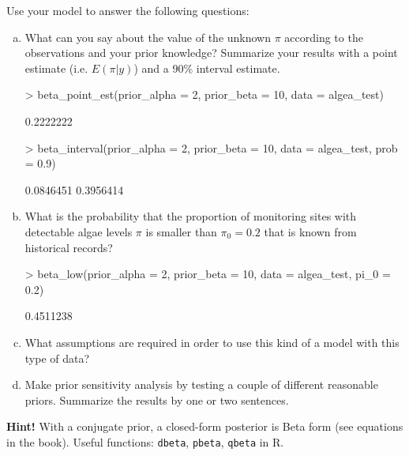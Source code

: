 \documentclass[a4paper,11pt]{article}
\begin{document}
Use your model to answer the following questions:
\begin{enumerate}[a)]
\item What can you say about the value of the unknown $\pi$ according
  to the observations and your prior knowledge? Summarize your results
  with a point estimate (i.e. $E(\pi|y)$) and a 90\% interval estimate.
\begin{Schunk}
\begin{Sinput}
> beta_point_est(prior_alpha = 2, prior_beta = 10, data = algea_test)
\end{Sinput}
\begin{Soutput}
[1] 0.2222222
\end{Soutput}
\begin{Sinput}
> beta_interval(prior_alpha = 2, prior_beta = 10, data = algea_test, prob = 0.9)
\end{Sinput}
\begin{Soutput}
[1] 0.0846451 0.3956414
\end{Soutput}
\end{Schunk}
\item What is the probability that the proportion of monitoring sites with detectable algae levels $\pi$ is smaller than $\pi_0=0.2$ that is known from historical records?
\begin{Schunk}
\begin{Sinput}
> beta_low(prior_alpha = 2, prior_beta = 10, data = algea_test, pi_0 = 0.2)
\end{Sinput}
\begin{Soutput}
[1] 0.4511238
\end{Soutput}
\end{Schunk}
\item What assumptions are required in order to use this kind of a
  model with this type of data?
\item Make prior sensitivity analysis by testing a couple of different reasonable priors. Summarize the results by one or two sentences.
\end{enumerate}
\textbf{Hint!} With a conjugate prior, a closed-form posterior is Beta form (see
equations in the book). Useful functions: {\tt dbeta}, {\tt pbeta}, {\tt qbeta} in R.
\end{document}

